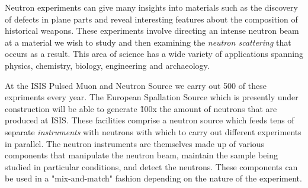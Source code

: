 Neutron experiments can give many insights into materials such as the discovery of defects in plane parts and reveal interesting features about the composition of historical weapons. These experiments involve directing an intense neutron beam at a material we wish to study and then examining the \textit{neutron scattering} that occurs as a result. This area of science has a wide variety of applications spanning physics, chemistry, biology, engineering and archaeology.

At the ISIS Pulsed Muon and Neutron Source we carry out 500 of these expriments every year. The European Spallation Source which is presently under construction will be able to generate \~100x the amount of neutrons that are produced at ISIS. These facilities comprise a neutron source which feeds tens of separate \textit{instruments} with neutrons with which to carry out different experiments in parallel. The neutron instruments are themselves made up of various components that manipulate the neutron beam, maintain the sample being studied in particular conditions, and detect the neutrons. These components can be used in a "mix-and-match" fashion depending on the nature of the experiment.

\iffalse
In order to analyse the results of neutron experiments reliably we need a record of the \textit{experiment configuration}. This means an accurate description of the detected neutrons and conditions of the sample, but also the precise geometry of the components in the neutron instrument which was used. This information is stored in NeXus files. The \textit{NeXus Constructor} is an application under development to allow scientists to define the instrument geometry and precisely what data should be recorded during an experiment.
\fi

